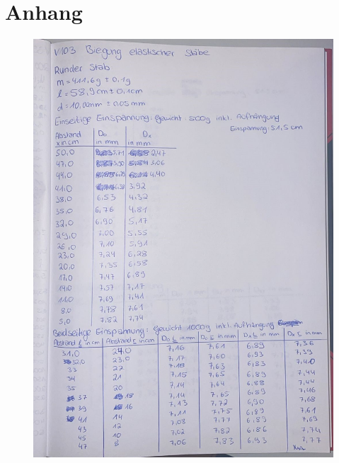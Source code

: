 \section*{Anhang}
\label{sec:Anhang}
\begin{figure}
    \centering
    \includegraphics[width=\textwidth]{messdaten/messdaten1.jpg}
\end{figure}

